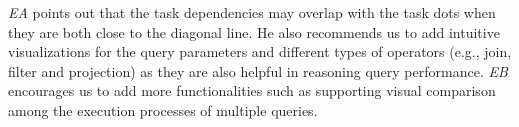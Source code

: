 \textit{EA} points out that the task dependencies may overlap with the task dots when they are both close to the diagonal line. He also recommends us to add intuitive visualizations for the query parameters and different types of operators (e.g., join, filter and projection) as they are also helpful in reasoning query performance. \textit{EB} encourages us to add more functionalities such as supporting visual comparison among the execution processes of multiple queries.